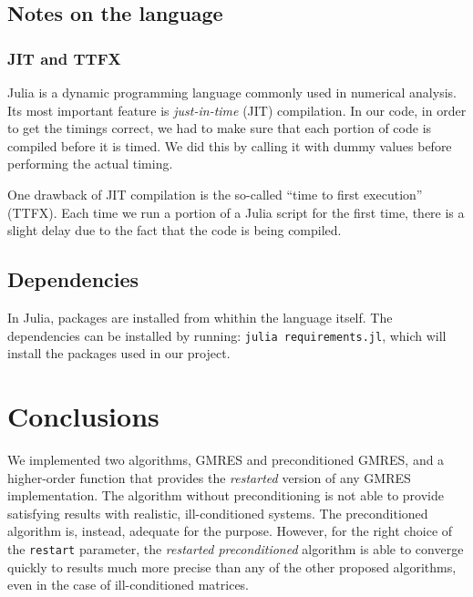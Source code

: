 \documentclass{article}
\begin{document}
\subsection{Notes on the language}

\subsubsection{JIT and TTFX}
Julia is a dynamic programming language commonly used in numerical analysis. Its most important feature is \emph{just-in-time} (JIT) compilation. In our code, in order to get the timings correct, we had to make sure that each portion of code is compiled before it is timed. We did this by calling it with dummy values before performing the actual timing.\smallskip

\noindent One drawback of JIT compilation is the so-called ``time to first execution'' (TTFX). Each time we run a portion of a Julia script for the first time, there is a slight delay due to the fact that the code is being compiled.

\subsection{Dependencies} In Julia, packages are installed from whithin the language itself. The dependencies can be installed by running: \texttt{julia requirements.jl}, which will install the packages used in our project.

\section{Conclusions}

We implemented two algorithms, GMRES and preconditioned GMRES, and a higher-order function that provides the \emph{restarted} version of any GMRES implementation. The algorithm without preconditioning is not able to provide satisfying results with realistic, ill-conditioned systems. The preconditioned algorithm is, instead, adequate for the purpose. However, for the right choice of the \texttt{restart} parameter, the \emph{restarted preconditioned} algorithm is able to converge quickly to results much more precise than any of the other proposed algorithms, even in the case of ill-conditioned matrices.

\newpage

\printbibliography %
\end{document}
